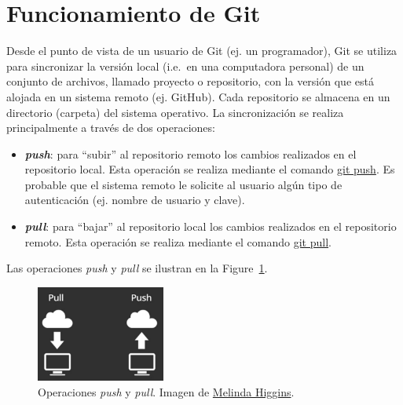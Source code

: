 \documentclass[
  letterpaper,
  DIV=11,
  numbers=noendperiod]{scrreprt}
\providecommand{\tightlist}{%
  \setlength{\itemsep}{0pt}\setlength{\parskip}{0pt}}\usepackage{longtable,booktabs,array}
\begin{document}
\hypertarget{funcionamiento-de-git}{%
\section{Funcionamiento de Git}\label{funcionamiento-de-git}}

Desde el punto de vista de un usuario de Git (ej. un programador), Git
se utiliza para sincronizar la versión local (i.e.~en una computadora
personal) de un conjunto de archivos, llamado proyecto o repositorio,
con la versión que está alojada en un sistema remoto (ej. GitHub). Cada
repositorio se almacena en un directorio (carpeta) del sistema
operativo. La sincronización se realiza principalmente a través de dos
operaciones:

\begin{itemize}
\tightlist
\item
  \textbf{\emph{push}}: para ``subir'' al repositorio remoto los cambios
  realizados en el repositorio local. Esta operación se realiza mediante
  el comando \href{https://git-scm.com/docs/git-push}{git push}. Es
  probable que el sistema remoto le solicite al usuario algún tipo de
  autenticación (ej. nombre de usuario y clave).
\item
  \textbf{\emph{pull}}: para ``bajar'' al repositorio local los cambios
  realizados en el repositorio remoto. Esta operación se realiza
  mediante el comando \href{https://git-scm.com/docs/git-pull}{git
  pull}.
\end{itemize}

Las operaciones \emph{push} y \emph{pull} se ilustran en la
Figure~\ref{fig-git-push-pull}.

\begin{figure}

{\centering \includegraphics[width=1.67in,height=\textheight]{./img/git-push-pull.png}

}

\caption{\label{fig-git-push-pull}Operaciones \emph{push} y \emph{pull}.
Imagen de
\href{https://www.coursera.org/learn/reproducible-templates-analysis/lecture/NGbQv/git-and-github-part-1}{Melinda
Higgins}.}

\end{figure}
\end{document}
